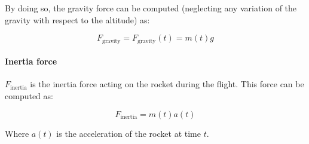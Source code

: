 By doing so, the gravity force can be computed (neglecting any variation of the gravity with respect to the altitude) as:

\begin{equation}
    F_{\text{gravity}} = F_{\text{gravity}}(t) = m(t) g
\end{equation}


\paragraph{Inertia force}

$F_{\text{inertia}}$ is the inertia force acting on the rocket during the flight.
This force can be computed as:

\begin{equation}
    F_{\text{inertia}} = m(t) a(t)
\end{equation}

Where $a(t)$ is the acceleration of the rocket at time $t$.

